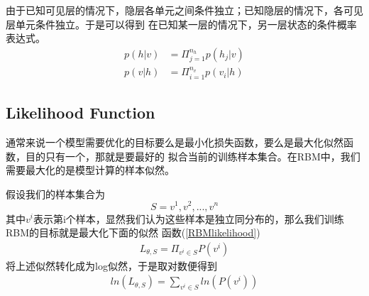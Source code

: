 \documentclass[UTF8]{ctexart}
\begin{document}
由于已知可见层的情况下，隐层各单元之间条件独立；已知隐层的情况下，各可见层单元条件独立。于是可以得到
在已知某一层的情况下，另一层状态的条件概率表达式。
\begin{align}
p(h|v) &= \Pi_{j=1}^{n_h} p(h_j|v)
\\
p(v|h) &= \Pi_{i=1}^{n_v} p(v_i|h)
\end{align}

\subsection{Likelihood Function}
通常来说一个模型需要优化的目标要么是最小化损失函数，要么是最大化似然函数，目的只有一个，那就是要最好的
拟合当前的训练样本集合。在RBM中，我们需要最大化的是模型计算的样本似然。
\par
假设我们的样本集合为
\[ S = {v^1, v^2, ..., v^n} \]
其中$v^i$表示第i个样本，显然我们认为这些样本是独立同分布的，那么我们训练RBM的目标就是最大化下面的似然
函数(\ref{RBMlikelihood})
\begin{align}
\label{RBMlikelihood}
L_{\theta, S} = \Pi_{v^i \in S} P(v^i)
\end{align}
将上述似然转化成为log似然，于是取对数便得到
\begin{align}
ln(L_{\theta, S}) = \sum_{v^i \in S} ln(P(v^i))
\end{align}
\end{document}
